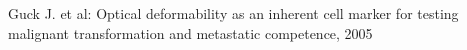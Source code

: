 \begin{thebibliography}{99}
 Guck J. et al: Optical deformability as an inherent cell marker for testing 	malignant transformation and metastatic competence, 2005

\end{thebibliography}